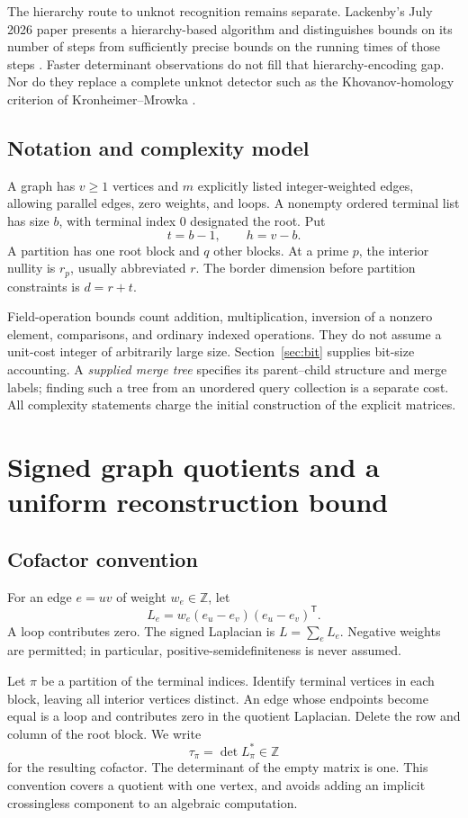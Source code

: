 \documentclass[11pt,letterpaper]{article}
\theoremstyle{definition}\newtheorem{definition}[theorem]{Definition}
\theoremstyle{remark}\newtheorem{remark}[theorem]{Remark}
\newcommand{\Z}{\mathbb Z}
\newcommand{\trans}{^{\mathsf T}}
\begin{document}
The hierarchy route to unknot recognition remains separate. Lackenby's July 2026 paper presents a hierarchy-based algorithm and distinguishes bounds on its number of steps from sufficiently precise bounds on the running times of those steps \cite{lackenby}. Faster determinant observations do not fill that hierarchy-encoding gap. Nor do they replace a complete unknot detector such as the Khovanov-homology criterion of Kronheimer--Mrowka \cite{km}.

\subsection{Notation and complexity model}
A graph has $v\geq1$ vertices and $m$ explicitly listed integer-weighted edges, allowing parallel edges, zero weights, and loops. A nonempty ordered terminal list has size $b$, with terminal index $0$ designated the root. Put
\[
 t=b-1,\qquad h=v-b.
\]
A partition has one root block and $q$ other blocks. At a prime $p$, the interior nullity is $r_p$, usually abbreviated $r$. The border dimension before partition constraints is $d=r+t$.

Field-operation bounds count addition, multiplication, inversion of a nonzero element, comparisons, and ordinary indexed operations. They do not assume a unit-cost integer of arbitrarily large size. Section~\ref{sec:bit} supplies bit-size accounting. A \emph{supplied merge tree} specifies its parent--child structure and merge labels; finding such a tree from an unordered query collection is a separate cost. All complexity statements charge the initial construction of the explicit matrices.

\section{Signed graph quotients and a uniform reconstruction bound}
\label{sec:graph}

\subsection{Cofactor convention}
For an edge $e=uv$ of weight $w_e\in\Z$, let
\[
 L_e=w_e(e_u-e_v)(e_u-e_v)\trans.
\]
A loop contributes zero. The signed Laplacian is $L=\sum_e L_e$. Negative weights are permitted; in particular, positive-semidefiniteness is never assumed.

Let $\pi$ be a partition of the terminal indices. Identify terminal vertices in each block, leaving all interior vertices distinct. An edge whose endpoints become equal is a loop and contributes zero in the quotient Laplacian. Delete the row and column of the root block. We write
\[
 \tau_\pi=\det L_\pi^*\in\Z
\]
for the resulting cofactor. The determinant of the empty matrix is one. This convention covers a quotient with one vertex, and avoids adding an implicit crossingless component to an algebraic computation.
\end{document}

